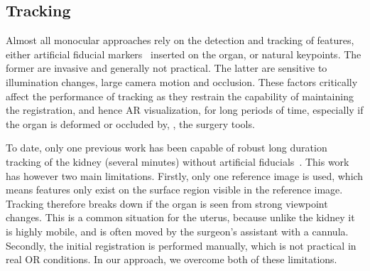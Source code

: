 
\subsection{Tracking}
\label{sec:sotaTracking}
Almost all monocular approaches rely on the detection and tracking of features, either artificial fiducial markers~\cite{Cohen2010Prostate} inserted on the organ, or natural keypoints. The former are invasive and generally not practical. The latter are sensitive to illumination changes, large camera motion and occlusion. These factors critically affect the performance of tracking as they restrain the capability of maintaining the registration, and hence AR visualization, for long periods of time, especially if the organ is deformed or occluded by, \eg, the surgery tools. 

To date, only one previous work has been capable of robust long duration tracking of the kidney (several minutes) without artificial fiducials~\cite{affineTracking}. 
This work has however two main limitations. 
Firstly, only one reference image is used, which means features only exist on the surface region visible in the reference image. 
Tracking therefore breaks down if the organ is seen from strong viewpoint changes. This is a common situation for the uterus, because unlike the kidney it is highly mobile, and is often moved by the surgeon's assistant with a cannula. 
Secondly, the initial registration is performed manually, which is not practical in real OR conditions. 
In our approach, we overcome both of these limitations. 



